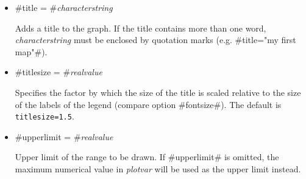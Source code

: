 \begin{itemize}
\item #title = #{\em characterstring}

Adds a title to the graph. If the title contains more than one
word, {\em characterstring} must be enclosed by quotation marks
(e.g. #title="my first map"#).

\item #titlesize = #{\em realvalue}

Specifies the factor by which the size of the title is scaled
relative to the size of the labels of the legend (compare option
#fontsize#). The default is \texttt{titlesize=1.5}.

\item #upperlimit = #{\em realvalue}

Upper limit of the range to be drawn. If #upperlimit# is omitted,
the maximum numerical value in {\em plotvar} will be used as the
upper limit instead.

\end{itemize}

